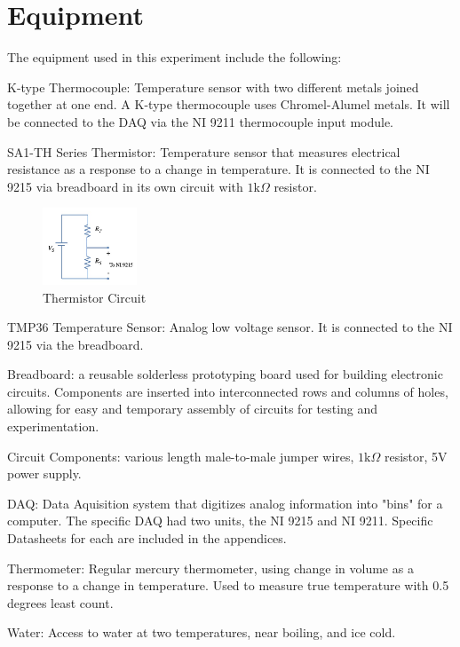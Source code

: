 \documentclass{article}
\begin{document}
\section{Equipment}
The equipment used in this experiment include the following:  

K-type Thermocouple:  Temperature sensor with two different metals joined together at one end.  A K-type thermocouple uses Chromel-Alumel metals.  It will be connected to the DAQ via the NI 9211 thermocouple input module.  

SA1-TH Series Thermistor:  Temperature sensor that measures electrical resistance as a response to a change in temperature.  It is connected to the NI 9215 via breadboard in its own circuit with $1\text{k}\Omega$ resistor.
\begin{figure}[H]
    \centering
    \includegraphics[width=0.25\textwidth]{lab2images/thermistor_circuit.jpg}
    \caption{Thermistor Circuit}
\end{figure}

TMP36 Temperature Sensor: Analog low voltage sensor.  It is connected to the NI 9215 via the breadboard.  

Breadboard: a reusable solderless prototyping board used for building electronic circuits. Components are inserted into interconnected rows and columns of holes, allowing for easy and temporary assembly of circuits for testing and experimentation.

Circuit Components:  various length male-to-male jumper wires, $1\text{k}\Omega$ resistor, 5V power supply.

DAQ:  Data Aquisition system that digitizes analog information into "bins" for a computer.  The specific DAQ had two units, the NI 9215 and NI 9211.  Specific Datasheets for each are included in the appendices.  

Thermometer:  Regular mercury thermometer, using change in volume as a response to a change in temperature.  Used to measure true temperature with 0.5 degrees least count.  

Water:  Access to water at two temperatures, near boiling, and ice cold. 
\end{document}
